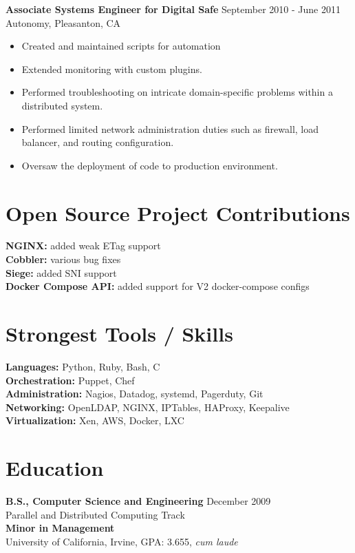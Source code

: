 \documentclass[10pt,line,letterpaper]{res}
\begin{document}
\begin{resume}
    {\bf Associate Systems Engineer for Digital Safe} \hfill September 2010 - June 2011 \\
    Autonomy, Pleasanton, CA
    \begin{itemize} \itemsep -2pt
    \item Created and maintained scripts for automation
    \item Extended monitoring with custom plugins.
    \item Performed troubleshooting on intricate domain-specific problems within a distributed system.
    \item Performed limited network administration duties such as firewall, load balancer, and routing configuration.
    \item Oversaw the deployment of code to production environment.
    \end{itemize}

\section {Open Source Project Contributions}
    {\bf NGINX:} added weak ETag support \\
    {\bf Cobbler:} various bug fixes \\
    {\bf Siege:} added SNI support \\
    {\bf Docker Compose API:} added support for V2 docker-compose configs

\section{Strongest Tools / Skills}
    {\bf Languages:} Python, Ruby, Bash, C \\
    {\bf Orchestration:} Puppet, Chef \\
    {\bf Administration:} Nagios, Datadog, systemd, Pagerduty, Git \\
    {\bf Networking:} OpenLDAP, NGINX, IPTables, HAProxy, Keepalive \\
    {\bf Virtualization:} Xen, AWS, Docker, LXC

\section{Education}
    {\bf B.S., Computer Science and Engineering} \hfill December 2009 \\
    Parallel and Distributed Computing Track \\
    {\bf Minor in Management} \\
    University of California, Irvine, GPA: 3.655, \textit{cum laude}

\end{resume}
\end{document}
